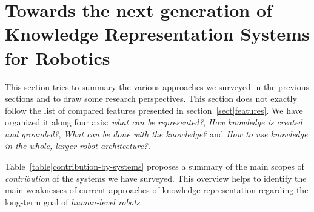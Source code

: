 \documentclass[a4paper, twocolumn]{article}
\begin{document}
\section{Towards the next generation of Knowledge Representation Systems for Robotics}
\label{sect|conclusion}

This section tries to summary the various approaches we surveyed in the
previous sections and to draw some research perspectives. This section does not
exactly follow the list of compared features presented in
section~\ref{sect|features}. We have organized it along four axis: \emph{what
can be represented?}, \emph{How knowledge is created and grounded?}, \emph{What
can be done with the knowledge?} and \emph{How to use knowledge in the whole,
larger robot architecture?}.

Table~\ref{table|contribution-by-systems} proposes a summary of the main scopes
of \emph{contribution} of the systems we have surveyed. This overview helps to
identify the main weaknesses of current approaches of knowledge representation
regarding the long-term goal of \emph{human-level robots}.
\end{document}
